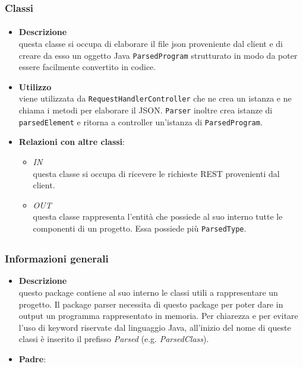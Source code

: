 \subsubsection{Classi}
\paragraph{}
\label{\nogloxy{SWEDesigner::Server::Parser::Parser}}
\begin{itemize}
\item \textbf{Descrizione}\\
questa classe si occupa di elaborare il file json proveniente dal client e di creare da esso un oggetto Java \texttt{ParsedProgram} strutturato in modo da poter essere facilmente convertito in codice.
\item \textbf{Utilizzo}\\
viene utilizzata da \texttt{RequestHandlerController} che ne crea un istanza e ne chiama i metodi per elaborare il JSON. \texttt{Parser} inoltre crea istanze di \texttt{parsedElement} e ritorna a controller un'istanza di \texttt{ParsedProgram}.
\item \textbf{Relazioni con altre classi}:
\begin{itemize}
\item \textit{IN} \hyperref[\nogloxy{SWEDesigner::Server::Controller::RequestHandlerController}]{}\\
questa classe si occupa di ricevere le richieste REST provenienti dal client.
\item \textit{OUT} \hyperref[\nogloxy{SWEDesigner::Server::Project::ParsedProgram}]{}\\
questa classe rappresenta l'entità che possiede al suo interno tutte le componenti di un progetto. Essa possiede più \texttt{ParsedType}.
\end{itemize}
\end{itemize}
\subsection{}
\label{\nogloxy{SWEDesigner::Server::Project}}
\subsubsection{Informazioni generali}
\begin{itemize}
\item \textbf{Descrizione}\\
questo package contiene al suo interno le classi utili a rappresentare un progetto. Il package parser necessita di questo package per poter dare in output un programma rappresentato in memoria. Per chiarezza e per evitare l'uso di keyword riservate dal linguaggio Java, all'inizio del nome di queste classi è inserito il prefisso \emph{Parsed} (e.g. \emph{ParsedClass}).
\item \textbf{Padre}: \hyperref[\nogloxy{SWEDesigner::Server}]{}
\end{itemize}
